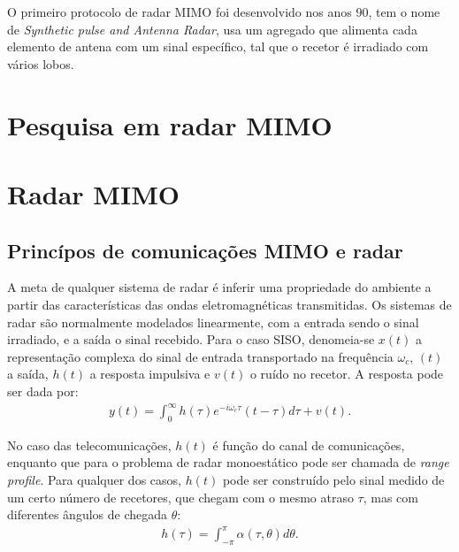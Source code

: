 \documentclass[purist,portuguese]{ist-report}
\begin{document}

O primeiro protocolo de radar MIMO foi desenvolvido nos anos 90, tem o nome de \textit{Synthetic pulse and Antenna Radar}, usa um agregado que alimenta cada elemento de antena com um sinal específico, tal que o recetor é irradiado com vários lobos. 



\section{Pesquisa em radar MIMO}

\section{Radar MIMO}

\subsection{Princípos de comunicações MIMO e radar}

A meta de qualquer sistema de radar é inferir uma propriedade do ambiente a partir das características das ondas eletromagnéticas transmitidas.
Os sistemas de radar são normalmente modelados linearmente, com a entrada sendo o sinal irradiado, e a saída o sinal recebido. 
Para o caso SISO, denomeia-se $x(t)$ a representação complexa do sinal de entrada transportado na frequência $\omega_c$, $(t)$ a saída, $h(t)$ a resposta impulsiva e $v(t)$ o ruído no recetor.
A resposta pode ser dada por:
\begin{align}
  y(t) = \int_0^\infty h(\tau)e^{-i\omega_c\tau}(t-\tau)d\tau + v(t).
  \label{eq:linearsiso}
\end{align}

No caso das telecomunicações, $h(t)$ é função do canal de comunicações, enquanto que para o problema de radar monoestático pode ser chamada de \textit{range profile}.
Para qualquer dos casos, $h(t)$ pode ser construído pelo sinal medido de um certo número de recetores, que chegam com o mesmo atraso $\tau$, mas com diferentes ângulos de chegada $\theta$:
\begin{align}
  h(\tau) = \int_{-\pi}^{\pi}\alpha(\tau,\theta)d\theta.
  \label{eq:profile}
\end{align}
\end{document}
